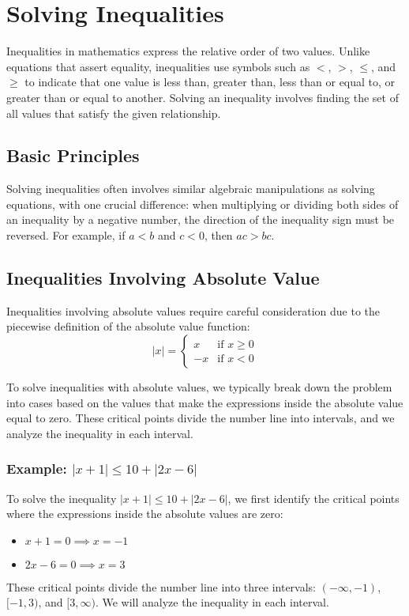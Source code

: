 \section{Solving Inequalities}

Inequalities in mathematics express the relative order of two values. Unlike equations that assert equality, inequalities use symbols such as $<$, $>$, $\leq$, and $\geq$ to indicate that one value is less than, greater than, less than or equal to, or greater than or equal to another. Solving an inequality involves finding the set of all values that satisfy the given relationship.

\subsection{Basic Principles}

Solving inequalities often involves similar algebraic manipulations as solving equations, with one crucial difference: when multiplying or dividing both sides of an inequality by a negative number, the direction of the inequality sign must be reversed. For example, if $a < b$ and $c < 0$, then $ac > bc$.

\subsection{Inequalities Involving Absolute Value}

Inequalities involving absolute values require careful consideration due to the piecewise definition of the absolute value function:
\[|x| = \begin{cases}
x & \text{if } x \geq 0 \\
-x & \text{if } x < 0
\end{cases}\]

To solve inequalities with absolute values, we typically break down the problem into cases based on the values that make the expressions inside the absolute value equal to zero. These critical points divide the number line into intervals, and we analyze the inequality in each interval.

\subsubsection{Example: $|x + 1| \leq 10 + |2x - 6|$}

To solve the inequality $|x + 1| \leq 10 + |2x - 6|$, we first identify the critical points where the expressions inside the absolute values are zero:
\begin{itemize}
    \item $x + 1 = 0 \implies x = -1$
    \item $2x - 6 = 0 \implies x = 3$
\end{itemize}
These critical points divide the number line into three intervals: $(-\infty, -1)$, $[-1, 3)$, and $[3, \infty)$. We will analyze the inequality in each interval.

